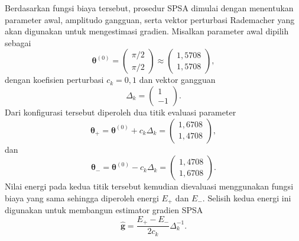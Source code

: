 Berdasarkan fungsi biaya tersebut, prosedur SPSA dimulai dengan menentukan parameter awal, amplitudo gangguan, serta vektor perturbasi Rademacher yang akan digunakan untuk mengestimasi gradien. Misalkan parameter awal dipilih sebagai
\begin{equation}
    \boldsymbol{\theta}^{(0)}
    =
    \begin{pmatrix}
        \pi/2 \\
        \pi/2
    \end{pmatrix}
    \approx
    \begin{pmatrix}
        1,5708 \\
        1,5708
    \end{pmatrix},
\end{equation}
dengan koefisien perturbasi $c_k = 0,1$ dan vektor gangguan
\begin{equation}
    \Delta_k
    =
    \begin{pmatrix}
        1\\
        -1
    \end{pmatrix}.
\end{equation}
Dari konfigurasi tersebut diperoleh dua titik evaluasi parameter
\begin{equation}
    \boldsymbol{\theta}_{+}
    =
    \boldsymbol{\theta}^{(0)}
    +
    c_k\Delta_k
    =
    \begin{pmatrix}
        1,6708\\
        1,4708
    \end{pmatrix},
\end{equation}
dan
\begin{equation}
    \boldsymbol{\theta}_{-}
    =
    \boldsymbol{\theta}^{(0)}
    -
    c_k\Delta_k
    =
    \begin{pmatrix}
        1,4708\\
        1,6708
    \end{pmatrix}.
\end{equation}
Nilai energi pada kedua titik tersebut kemudian dievaluasi menggunakan fungsi biaya yang sama sehingga diperoleh energi $E_{+}$ dan $E_{-}$. Selisih kedua energi ini digunakan untuk membangun estimator gradien SPSA
\begin{equation}
    \hat{\mathbf{g}}
    =
    \frac{
    E_{+}-E_{-}
    }{
    2c_k
    }
    \Delta_k^{-1}.
\end{equation}


